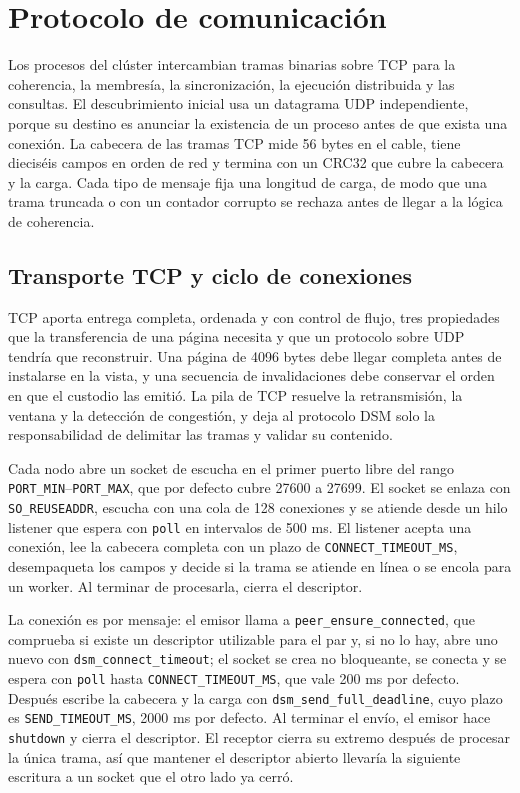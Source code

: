 \section{Protocolo de comunicación}\label{sec:protocolo}

Los procesos del clúster intercambian tramas binarias sobre TCP para la coherencia, la membresía, la sincronización, la ejecución distribuida y las consultas. El descubrimiento inicial usa un datagrama UDP independiente, porque su destino es anunciar la existencia de un proceso antes de que exista una conexión. La cabecera de las tramas TCP mide 56 bytes en el cable, tiene dieciséis campos en orden de red y termina con un CRC32 que cubre la cabecera y la carga. Cada tipo de mensaje fija una longitud de carga, de modo que una trama truncada o con un contador corrupto se rechaza antes de llegar a la lógica de coherencia.

\subsection{Transporte TCP y ciclo de conexiones}

TCP aporta entrega completa, ordenada y con control de flujo, tres propiedades que la transferencia de una página necesita y que un protocolo sobre UDP tendría que reconstruir. Una página de 4096 bytes debe llegar completa antes de instalarse en la vista, y una secuencia de invalidaciones debe conservar el orden en que el custodio las emitió. La pila de TCP resuelve la retransmisión, la ventana y la detección de congestión, y deja al protocolo DSM solo la responsabilidad de delimitar las tramas y validar su contenido.

Cada nodo abre un socket de escucha en el primer puerto libre del rango \texttt{PORT\_MIN}--\texttt{PORT\_MAX}, que por defecto cubre 27600 a 27699. El socket se enlaza con \texttt{SO\_REUSEADDR}, escucha con una cola de 128 conexiones y se atiende desde un hilo listener que espera con \texttt{poll} en intervalos de 500 ms. El listener acepta una conexión, lee la cabecera completa con un plazo de \texttt{CONNECT\_TIMEOUT\_MS}, desempaqueta los campos y decide si la trama se atiende en línea o se encola para un worker. Al terminar de procesarla, cierra el descriptor.

La conexión es por mensaje: el emisor llama a \texttt{peer\_ensure\_connected}, que comprueba si existe un descriptor utilizable para el par y, si no lo hay, abre uno nuevo con \texttt{dsm\_connect\_timeout}; el socket se crea no bloqueante, se conecta y se espera con \texttt{poll} hasta \texttt{CONNECT\_TIMEOUT\_MS}, que vale 200 ms por defecto. Después escribe la cabecera y la carga con \texttt{dsm\_send\_full\_deadline}, cuyo plazo es \texttt{SEND\_TIMEOUT\_MS}, 2000 ms por defecto. Al terminar el envío, el emisor hace \texttt{shutdown} y cierra el descriptor. El receptor cierra su extremo después de procesar la única trama, así que mantener el descriptor abierto llevaría la siguiente escritura a un socket que el otro lado ya cerró.

